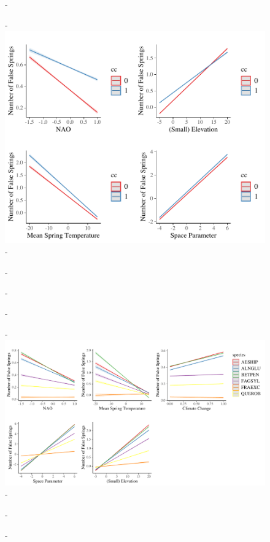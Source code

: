 \documentclass{article}\usepackage[]{graphicx}\usepackage[]{color}
\begin{document}
{\begin{figure} [H]
  -\begin{center}
  -\includegraphics[width=12cm]{..//figures/InteractionPlots/InteractionPlots.pdf}
  -\caption{}\label{fig:hadbrms}
  -\end{center}
  -\end{figure}}
  
{\begin{figure} [H]
  -\begin{center}
  -\includegraphics[width=16cm]{..//figures/InteractionPlots/SpeciesIntrxnPlots.pdf}
  -\caption{}\label{fig:maineffects}
  -\end{center}
  -\end{figure}}
  
\end{document}
